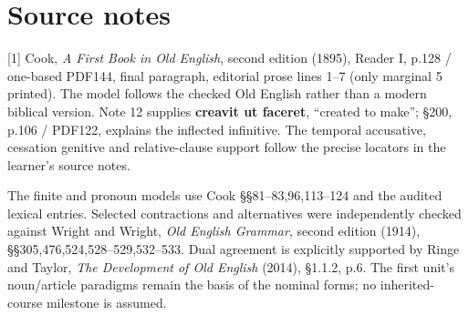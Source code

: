 \par\begin{minipage}{\linewidth}\raggedright

\end{minipage}\par\addvspace{4pt}

\clearpage
\section*{Source notes}

\begingroup\fontsize{10}{12.8}\selectfont
[1] Cook, \emph{A First Book in Old English}, second edition (1895), Reader I, p.128 /\allowbreak{} one-based PDF144, final paragraph, editorial prose lines 1–7 (only marginal 5 printed). The model follows the checked Old English rather than a modern biblical version. Note 12 supplies \textbf{creavit ut faceret}, “created to make”; §200, p.106 /\allowbreak{} PDF122, explains the inflected infinitive. The temporal accusative, cessation genitive and relative-clause support follow the precise locators in the learner’s source notes.

The finite and pronoun models use Cook §§81–83,96,113–124 and the audited lexical entries. Selected contractions and alternatives were independently checked against Wright and Wright, \emph{Old English Grammar}, second edition (1914), §§305,476,524,528–529,532–533. Dual agreement is explicitly supported by Ringe and Taylor, \emph{The Development of Old English} (2014), §1.1.2, p.6. The first unit’s noun/\allowbreak{}article paradigms remain the basis of the nominal forms; no inherited-course milestone is assumed.

\endgroup


